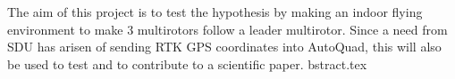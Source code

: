 The aim of this project is to test the hypothesis by making an indoor flying environment to make 3 multirotors follow a leader multirotor. Since a need from SDU has arisen of sending RTK GPS coordinates into AutoQuad, this will also be used to test and to contribute to a scientific paper.
bstract.tex

